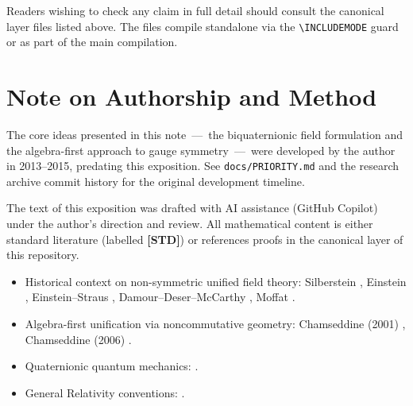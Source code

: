 \documentclass[12pt,a4paper]{article}
\theoremstyle{definition}
\theoremstyle{remark}
\begin{document}
\bigskip
\noindent
Readers wishing to check any claim in full detail should consult the canonical
layer files listed above.  The files compile standalone via
the \verb|\INCLUDEMODE| guard or as part of the main compilation.

\section*{Note on Authorship and Method}
\label{sec:authorship}

The core ideas presented in this note~---~the biquaternionic field
formulation and the algebra-first approach to gauge symmetry~---~were
developed by the author in 2013--2015, predating this exposition.
See \texttt{docs/PRIORITY.md} and the research archive commit history for
the original development timeline.

The text of this exposition was drafted with AI assistance (GitHub Copilot)
under the author's direction and review.  All mathematical content is either
standard literature (labelled \textbf{[STD]}) or references proofs in the
canonical layer of this repository.

\begin{itemize}
  \item Historical context on non-symmetric unified field theory:
    Silberstein \cite{silberstein1912},
    Einstein \cite{einstein1945},
    Einstein--Straus \cite{einstein_straus1946},
    Damour--Deser--McCarthy \cite{damour_deser_mccarthy1992},
    Moffat \cite{moffat_ngt1995}.
  \item Algebra-first unification via noncommutative geometry:
    Chamseddine (2001) \cite{chamseddine2001},
    Chamseddine (2006) \cite{chamseddine2006}.
  \item Quaternionic quantum mechanics: \cite{adler1995}.
  \item General Relativity conventions: \cite{mtw1973,wald1984}.
\end{itemize}


\ifdefined\INCLUDEMODE
\else
\end{document}
